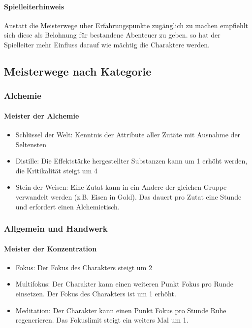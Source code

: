 \documentclass{article}
\begin{document}
\begin{mdframed}[hidealllines=true, backgroundcolor=black!10]
\paragraph{Spielleiterhinweis}

Anstatt die Meisterwege über Erfahrungspunkte zugänglich zu machen empfiehlt sich diese als Belohnung für bestandene
Abenteuer zu geben. so hat der Spielleiter mehr Einfluss darauf wie mächtig die Charaktere werden.

\end{mdframed}
\begin{center}
\subsection{Meisterwege nach Kategorie}
\end{center}

\subsubsection{Alchemie}

\paragraph{Meister der Alchemie}

\begin{itemize}
\item Schlüssel der Welt: Kenntnis der Attribute aller Zutäte mit Ausnahme der Seltensten
\item Distille: Die Effektstärke hergestellter Substanzen kann um 1 erhöht werden, die Kritikalität steigt um 4
\item Stein der Weisen: Eine Zutat kann in ein Andere der gleichen Gruppe verwandelt werden (z.B. Eisen in Gold). Das dauert pro Zutat eine Stunde und erfordert einen Alchemietisch.
\end{itemize}

\subsubsection{Allgemein und Handwerk}

\paragraph{Meister der Konzentration}

\begin{itemize}
\item Fokus: Der Fokus des Charakters steigt um 2
\item Multifokus: Der Charakter kann einen weiteren Punkt Fokus pro Runde einsetzen. Der Fokus des Charakters ist um 1 erhöht.
\item Meditation: Der Charakter kann einen Punkt Fokus pro Stunde Ruhe regenerieren. Das Fokuslimit steigt ein weiters Mal um 1.
\end{itemize}
\end{document}
